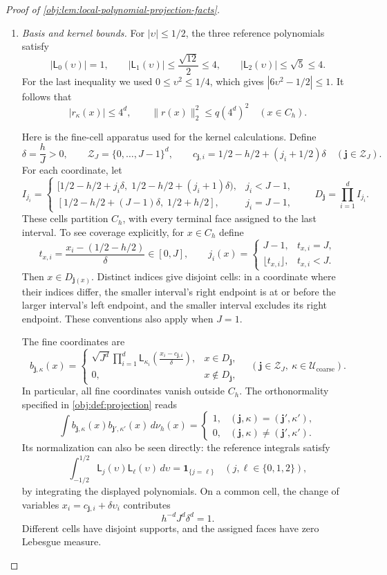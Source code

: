 \documentclass[11pt]{article}
\begin{document}
\begin{proof}[Proof of \cref{obj:lem:local-polynomial-projection-facts}]
\begin{enumerate}
\item \emph{Basis and kernel bounds.}
For \(|\upsilon|\le1/2\), the three reference polynomials satisfy
\[
|\mathsf L_0(\upsilon)|=1,\qquad
|\mathsf L_1(\upsilon)|\le\frac{\sqrt{12}}2\le4,\qquad
|\mathsf L_2(\upsilon)|\le\sqrt5\le4.
\]
For the last inequality we used
\(0\le\upsilon^2\le1/4\), which gives
\(|6\upsilon^2-1/2|\le1\). It follows that
\[
|r_\kappa(x)|\le4^d,
\qquad
\|r(x)\|_2^2\le q(4^d)^2
\quad(x\in C_h).
\]

Here is the fine-cell apparatus used for the kernel calculations.
Define
\[
\delta=\frac hJ>0,\qquad
\mathcal Z_J=\{0,\ldots,J-1\}^d,
\qquad
c_{\mathbf j,i}=1/2-h/2+(j_i+1/2)\delta
\quad(\mathbf j\in\mathcal Z_J).
\]
For each coordinate, let
\[
I_{j_i}=
\begin{cases}
[1/2-h/2+j_i\delta,\;1/2-h/2+(j_i+1)\delta),
 &j_i<J-1,\\
[1/2-h/2+(J-1)\delta,\;1/2+h/2],
 &j_i=J-1,
\end{cases}
\qquad
D_{\mathbf j}=\prod_{i=1}^d I_{j_i}.
\]
These cells partition \(C_h\), with every terminal face assigned to the
last interval. To see coverage explicitly, for \(x\in C_h\) define
\[
t_{x,i}=\frac{x_i-(1/2-h/2)}{\delta}\in[0,J],
\qquad
j_i(x)=
\begin{cases}
J-1,&t_{x,i}=J,\\
\lfloor t_{x,i}\rfloor,&t_{x,i}<J.
\end{cases}
\]
Then \(x\in D_{\mathbf j(x)}\). Distinct indices give disjoint cells:
in a coordinate where their indices differ, the smaller interval's right
endpoint is at or before the larger interval's left endpoint, and the
smaller interval excludes its right endpoint.
These conventions also apply when \(J=1\).

The fine coordinates are
\[
b_{\mathbf j,\kappa}(x)=
\begin{cases}
\displaystyle
\sqrt{J^d}\prod_{i=1}^d
 \mathsf L_{\kappa_i}\!\left(\frac{x_i-c_{\mathbf j,i}}{\delta}\right),
 &x\in D_{\mathbf j},\\
0,&x\notin D_{\mathbf j},
\end{cases}
\quad
(\mathbf j\in\mathcal Z_J,\ \kappa\in\mathcal U_{\mathrm{coarse}}).
\]
In particular, all fine coordinates vanish outside \(C_h\).
The orthonormality specified in \cref{obj:def:projection} reads
\[
\int b_{\mathbf j,\kappa}(x)b_{\mathbf j',\kappa'}(x)\,d\nu_h(x)
 =
\begin{cases}
1,&(\mathbf j,\kappa)=(\mathbf j',\kappa'),\\
0,&(\mathbf j,\kappa)\ne(\mathbf j',\kappa').
\end{cases}
\]
Its normalization can also be seen directly: the reference integrals satisfy
\[
\int_{-1/2}^{1/2}\mathsf L_j(\upsilon)\mathsf L_\ell(\upsilon)\,d\upsilon
 =\mathbf1_{\{j=\ell\}}
 \quad(j,\ell\in\{0,1,2\}),
\]
by integrating the displayed polynomials. On a common cell, the
change of variables \(x_i=c_{\mathbf j,i}+\delta\upsilon_i\) contributes
\[
h^{-d}J^d\delta^d=1.
\]
Different cells have disjoint supports, and the assigned faces have zero
Lebesgue measure.


\end{enumerate}
\end{proof}
\end{document}
